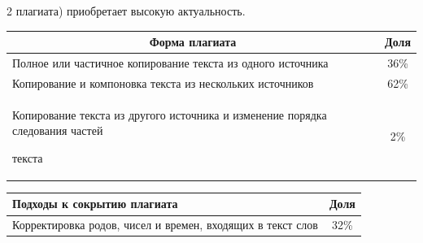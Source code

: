 \begin{multicols}{2}
плагиата) приобретает высокую актуальность.



\begin{table}\small

\begin{center}


\vspace*{2ex}



\begin{tabular}{|l|c|}

\hline

\multicolumn{1}{|c|}{Форма плагиата}&Доля\\

\hline

Полное или частичное копирование текста из одного источника&36\%\\

Копирование и компоновка текста из нескольких источников&62\%\\

Копирование текста из другого источника и изменение порядка следования частей 

текста&\hphantom{9}2\%\\

\hline

\end{tabular}

\end{center}



\begin{center}


\vspace*{2ex}



\tabcolsep=8pt

\begin{tabular}{|l|c|}

\hline

Подходы к сокрытию плагиата&Доля\\

\hline

Корректировка родов, чисел и времен, входящих в текст слов&32\%\\


\end{tabular}
\end{center}
\end{table}
\end{multicols}
